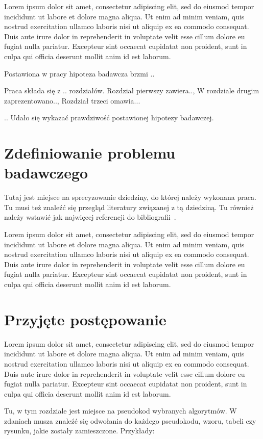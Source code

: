 \documentclass[final,a4paper,openany,12pt]{mwbk}
\begin{document}
Lorem ipsum dolor sit amet, consectetur adipiscing elit, sed do eiusmod tempor incididunt ut labore et dolore magna aliqua. Ut enim ad minim veniam, quis nostrud exercitation ullamco laboris nisi ut aliquip ex ea commodo consequat. Duis aute irure dolor in reprehenderit in voluptate velit esse cillum dolore eu fugiat nulla pariatur. Excepteur sint occaecat cupidatat non proident, sunt in culpa qui officia deserunt mollit anim id est laborum.

Postawiona w pracy hipoteza badawcza brzmi ..

Praca składa się z .. rozdziałów. Rozdział pierwszy zawiera.., W rozdziale drugim zaprezentowano.., Rozdział trzeci omawia...

.. Udało się wykazać prawdziwość postawionej hipotezy badawczej.

\chapter{Zdefiniowanie problemu badawczego}

Tutaj jest miejsce na sprecyzowanie dziedziny, do której należy wykonana praca. Tu musi też znaleźć się przegląd literatury związanej z tą dziedziną. Tu również należy wstawić jak najwięcej referencji do bibliografii~\cite{Lindsay,Urban}.

Lorem ipsum dolor sit amet, consectetur adipiscing elit, sed do eiusmod tempor incididunt ut labore et dolore magna aliqua. Ut enim ad minim veniam, quis nostrud exercitation ullamco laboris nisi ut aliquip ex ea commodo consequat. Duis aute irure dolor in reprehenderit in voluptate velit esse cillum dolore eu fugiat nulla pariatur. Excepteur sint occaecat cupidatat non proident, sunt in culpa qui officia deserunt mollit anim id est laborum.

\chapter{Przyjęte postępowanie}

Lorem ipsum dolor sit amet, consectetur adipiscing elit, sed do eiusmod tempor incididunt ut labore et dolore magna aliqua. Ut enim ad minim veniam, quis nostrud exercitation ullamco laboris nisi ut aliquip ex ea commodo consequat. Duis aute irure dolor in reprehenderit in voluptate velit esse cillum dolore eu fugiat nulla pariatur. Excepteur sint occaecat cupidatat non proident, sunt in culpa qui officia deserunt mollit anim id est laborum.

Tu, w tym rozdziale jest miejsce na pseudokod wybranych algorytmów. W zdaniach musza znaleźć się odwołania do każdego pseudokodu, wzoru, tabeli czy rysunku, jakie zostały zamieszczone. Przykłady:
\vspace{2mm}
\end{document}
